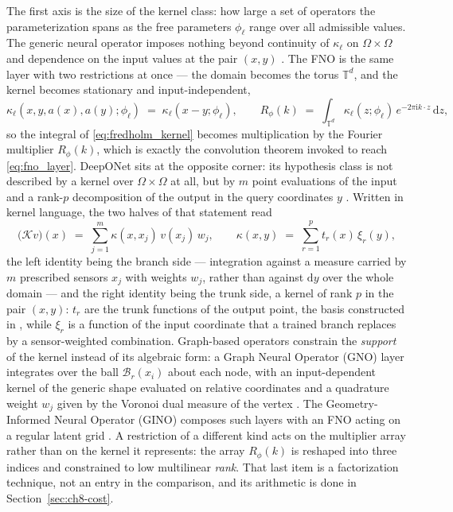 The first axis is the size of the kernel class: how large a set of operators the parameterization spans as the free parameters $\phi_\ell$ range over all admissible values. The generic neural operator imposes nothing beyond continuity of $\kappa_\ell$ on $\Omega\times\Omega$ and dependence on the input values at the pair $(x,y)$ \cite{kovachki2023neural}. The FNO is the same layer with two restrictions at once --- the domain becomes the torus $\mathbb{T}^d$, and the kernel becomes stationary and input-independent,
\begin{equation}
  \label{eq:ch8-fno-specialization}
  \kappa_\ell(x,y,a(x),a(y);\phi_\ell) \;=\; \kappa_\ell(x-y;\phi_\ell),
  \qquad
  R_\phi(k) \;=\; \int_{\mathbb{T}^d} \kappa_\ell(z;\phi_\ell)\, e^{-2\pi \mathrm{i} k\cdot z}\, \mathrm{d}z,
\end{equation}
so the integral of \eqref{eq:fredholm_kernel} becomes multiplication by the Fourier multiplier $R_\phi(k)$, which is exactly the convolution theorem invoked to reach \eqref{eq:fno_layer}. DeepONet sits at the opposite corner: its hypothesis class is not described by a kernel over $\Omega\times\Omega$ at all, but by $m$ point evaluations of the input and a rank-$p$ decomposition of the output in the query coordinates $y$ \cite{lu2021learning}. Written in kernel language, the two halves of that statement read
\begin{equation}
  \label{eq:ch8-deeponet-kernel}
  \big(\mathcal{K}v\big)(x) \;=\; \sum_{j=1}^{m} \kappa(x,x_j)\, v(x_j)\, w_j,
  \qquad
  \kappa(x,y) \;=\; \sum_{r=1}^{p} t_r(x)\, \xi_r(y),
\end{equation}
the left identity being the branch side --- integration against a measure carried by $m$ prescribed sensors $x_j$ with weights $w_j$, rather than against $\mathrm{d}y$ over the whole domain --- and the right identity being the trunk side, a kernel of rank $p$ in the pair $(x,y)$: $t_r$ are the trunk functions of the output point, the basis constructed in , while $\xi_r$ is a function of the input coordinate that a trained branch replaces by a sensor-weighted combination. Graph-based operators constrain the \emph{support} of the kernel instead of its algebraic form: a Graph Neural Operator (GNO)  layer integrates over the ball $\mathcal{B}_r(x_i)$ about each node, with an input-dependent kernel of the generic shape evaluated on relative coordinates and a quadrature weight $w_j$ given by the Voronoi dual measure of the vertex \cite{li2023geometry,brandstetter2022message}. The Geometry-Informed Neural Operator (GINO)  composes such layers with an FNO acting on a regular latent grid \cite{li2023geometry}. A restriction of a different kind acts on the multiplier array rather than on the kernel it represents: the array $R_\phi(k)$ is reshaped into three indices and constrained to low multilinear \emph{rank}. That last item is a factorization technique, not an entry in the comparison, and its arithmetic is done in Section~\ref{sec:ch8-cost}.

